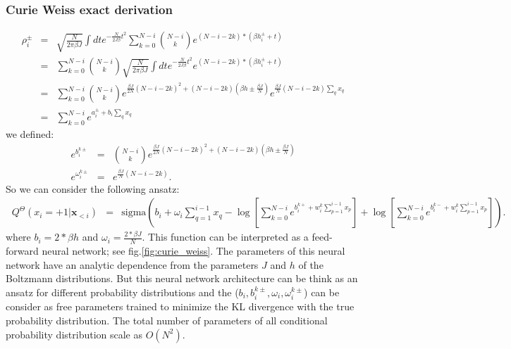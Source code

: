 \documentclass{article}
\begin{document}
 \subsubsection{Curie Weiss exact derivation}
 \begin{eqnarray*}
 \rho_i^{\pm} &=& \sqrt{\frac{N}{2\pi \beta J}}\int dt e^{-\frac{N}{2J \beta}t^{2}} 
 \sum_{k=0}^{N-i} \binom{N-i}{k} e^{(N-i-2k)*(\beta h_i^{\pm} + t)}\\
 &=& \sum_{k=0}^{N-i} \binom{N-i}{k} \sqrt{\frac{N}{2\pi \beta J}}\int dt e^{-\frac{N}{2J \beta}t^{2}} 
  e^{(N-i-2k)*(\beta h_i^{\pm} + t)}\\
&=& \sum_{k=0}^{N-i} \binom{N-i}{k}e^{\frac{\beta J}{2N}\left(N-i-2k\right)^{2}+\left(N-i-2k\right)\left(\beta h\pm\frac{\beta J}{N}\right)} e^{\frac{\beta J}{N}\left(N-i-2k\right) \sum_q x_q} \\
&=& \sum_{k=0}^{N-i} e^{a_i^{\pm} + b_i \sum_q x_q} 
\end{eqnarray*}
we defined:
\begin{eqnarray}
\label{eq:params}
e^{b_{i}^{k\pm}} & = & \binom{N-i}{k}e^{\frac{\beta J}{2N}\left(N-i-2k\right)^{2}+\left(N-i-2k\right)\left(\beta h\pm\frac{\beta J}{N}\right)}\\
e^{\omega_{i}^{k\pm}} & = & e^{\frac{\beta J}{N}\left(N-i-2k\right)}.
\end{eqnarray}
So we can consider the following ansatz:
\begin{eqnarray}\
\label{eq:curie_weiss_cond}
Q^{\Theta}\left(x_{i}=+1|\mathbf{x}_{<i}\right) & = & \text{sigma}\left(b_{i}+\omega_{i}\sum_{q=1}^{i-1}x_{q}-\log\left[\sum_{k=0}^{N-i}e^{b_{i}^{k+}+w_{i}^{k}\sum_{p=1}^{i-1}x_{p}}\right]+\log\left[\sum_{k=0}^{N-i}e^{b_{i}^{k-}+w_{i}^{k}\sum_{p=1}^{i-1}x_{p}}\right]\right).
\end{eqnarray}
where $b_i=2*\beta h$ and $\omega_i=\frac{2*\beta J}{N}$. 
\newline
This function can be interpreted as a feed-forward neural network; see fig.\ref{fig:curie_weiss}. The parameters of this neural network have an analytic dependence from the parameters $J$ and $h$ of the Boltzmann distributions. But this neural network architecture can be think as an ansatz for different probability distributions and the ($b_i, b_i^{k\pm}, \omega_i, \omega_i^{k\pm}$) can be consider as free parameters trained to minimize the KL divergence with the true probability distribution. 
The total number of parameters of all conditional probability distribution scale as $O(N^2)$.
\end{document}
